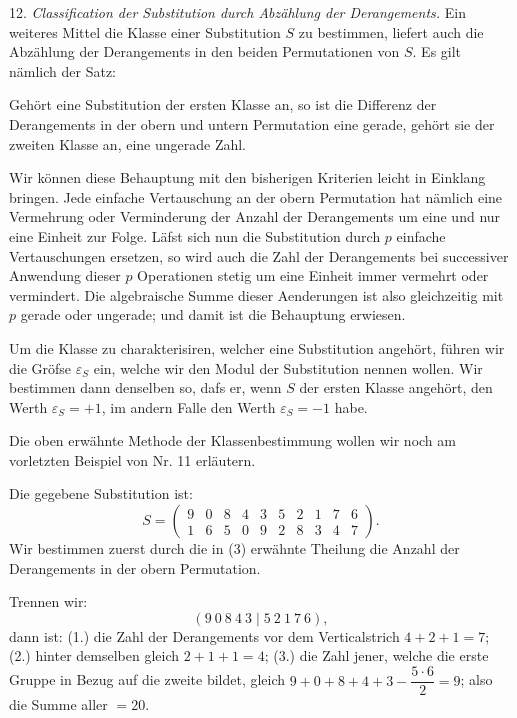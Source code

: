\documentclass[11pt]{article}
\providecommand{\weberpage}[1]{}
\begin{document}
12. \textit{Classification der Substitution durch Abzählung der Derangements.} Ein weiteres Mittel die Klasse einer Substitution $S$ zu bestimmen, liefert auch die Abzählung der Derangements in den beiden Permutationen von $S$. Es gilt nämlich der Satz:

\glqq Gehört eine Substitution der ersten Klasse an, so ist die Differenz der Derangements in der obern und untern Permutation eine gerade, gehört sie der zweiten Klasse an, eine ungerade Zahl.\grqq{}


\weberpage{15}
Wir können diese Behauptung mit den bisherigen Kriterien leicht in Einklang bringen. Jede einfache Vertauschung an der obern Permutation hat nämlich eine Vermehrung oder Verminderung der Anzahl der Derangements um eine und nur eine Einheit zur Folge. Läfst sich nun die Substitution durch $p$ einfache Vertauschungen ersetzen, so wird auch die Zahl der Derangements bei successiver Anwendung dieser $p$ Operationen stetig um eine Einheit immer vermehrt oder vermindert. Die algebraische Summe dieser Aenderungen ist also gleichzeitig mit $p$ gerade oder ungerade; und damit ist die Behauptung erwiesen.

Um die Klasse zu charakterisiren, welcher eine Substitution angehört, führen wir die Gröfse $\varepsilon_S$ ein, welche wir den Modul der Substitution nennen wollen. Wir bestimmen dann denselben so, dafs er, wenn $S$ der ersten Klasse angehört, den Werth $\varepsilon_S = +1$, im andern Falle den Werth $\varepsilon_S = -1$ habe.

Die oben erwähnte Methode der Klassenbestimmung wollen wir noch am vorletzten Beispiel von Nr. 11 erläutern.

Die gegebene Substitution ist:
\[
S = \begin{pmatrix} 9 & 0 & 8 & 4 & 3 & 5 & 2 & 1 & 7 & 6 \\ 1 & 6 & 5 & 0 & 9 & 2 & 8 & 3 & 4 & 7 \end{pmatrix}.
\]
Wir bestimmen zuerst durch die in (3) erwähnte Theilung die Anzahl der Derangements in der obern Permutation.

Trennen wir:
\[
(9\ 0\ 8\ 4\ 3 \mid 5\ 2\ 1\ 7\ 6),
\]
dann ist: (1.) die Zahl der Derangements vor dem Verticalstrich $4 + 2 + 1 = 7$; (2.) hinter demselben gleich $2 + 1 + 1 = 4$; (3.) die Zahl jener, welche die erste Gruppe in Bezug auf die zweite bildet, gleich $9 + 0 + 8 + 4 + 3 - \dfrac{5 \cdot 6}{2} = 9$; also die Summe aller $= 20$. %
\end{document}
